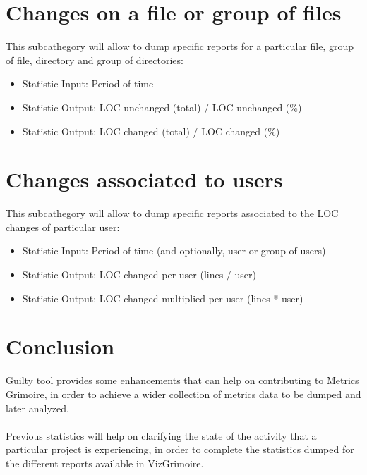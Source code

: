 \documentclass[11pt]{article}
\begin{document}
\section{Changes on a file or group of files}
This subcathegory will allow to dump specific reports for a particular file, group of file, directory and group of directories:
\begin{itemize}
\item{Statistic Input}:  Period of time
\item{Statistic Output}: LOC unchanged (total) / LOC unchanged (\%) 
\item{Statistic Output}: LOC changed (total) / LOC changed (\%) 
\end{itemize}

\section{Changes associated to users}
This subcathegory will allow to dump specific reports associated to the LOC changes of particular user:
\begin{itemize}
\item{Statistic Input}:  Period of time (and optionally, user or group of users)
\item{Statistic Output}: LOC changed per user (lines / user) 
\item{Statistic Output}: LOC changed multiplied per user (lines * user) 
\end{itemize}

\section{Conclusion}
Guilty tool provides some enhancements that can help on contributing to Metrics Grimoire, in order to achieve a wider collection of metrics data to be dumped and later analyzed.\\
\\
Previous statistics will help on clarifying the state of the activity that a particular project is experiencing, in order to complete the statistics dumped for the different reports available in VizGrimoire. 
\end{document}
